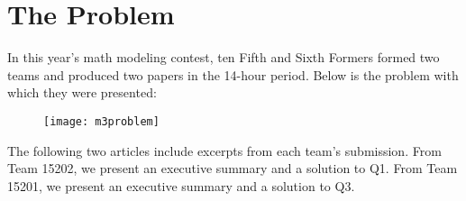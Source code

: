 \section*{The Problem}

In this year's math modeling contest, ten Fifth and Sixth Formers formed two teams and produced two papers in the 14-hour period. Below is the problem with which they were presented:
	
	\begin{figure}[h!]
    \centering
    \texttt{[image: m3problem]}
    \end{figure}
	
The following two articles include excerpts from each team's submission. From Team 15202, we present an executive summary and a solution to Q1. From Team 15201, we present an executive summary and a solution to Q3.
